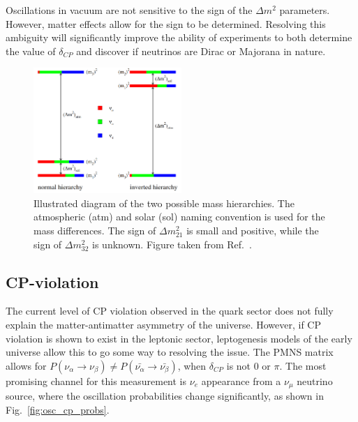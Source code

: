 Oscillations in vacuum are not sensitive to the sign of the $\Delta m^{2}$ parameters. However,
matter effects allow for the sign to be determined. Resolving this ambiguity will significantly
improve the ability of experiments to both determine the value of $\delta_{CP}$ and discover if
neutrinos are Dirac or Majorana in nature.

\begin{figure} %
    \includegraphics[origin=c,width=0.5\textwidth]{diagrams/3-theory/hierarchy.png}
    \caption[Illustration of the two possible mass hierarchies]
    {Illustrated diagram of the two possible mass hierarchies. The atmospheric (atm) and solar
        (sol) naming convention is used for the mass differences. The sign of
        $\Delta m_{21}^{2}$ is small and positive, while the sign of $\Delta m_{32}^{2}$ is
        unknown. Figure taken from Ref.~\cite{gouvea2013}.}
    \label{fig:hierarchy}
\end{figure}

\subsection{CP-violation} %
\label{sec:theory_questions_cp} %

The current level of CP violation observed in the quark sector does not fully explain the
matter-antimatter asymmetry of the universe. However, if CP violation is shown to exist in the
leptonic sector, leptogenesis models of the early universe allow this to go some way to resolving
the issue. The PMNS matrix allows for
$P(\nu_{\alpha}\rightarrow\nu_{\beta}) \neq P(\bar{\nu_{\alpha}}\rightarrow\bar{\nu_{\beta}})$,
when $\delta_{CP}$ is not 0 or $\pi$. The most promising channel for this measurement is $\nu_{e}$
appearance from a $\nu_{\mu}$ neutrino source, where the oscillation probabilities change
significantly, as shown in Fig.~\ref{fig:osc_cp_probs}.


